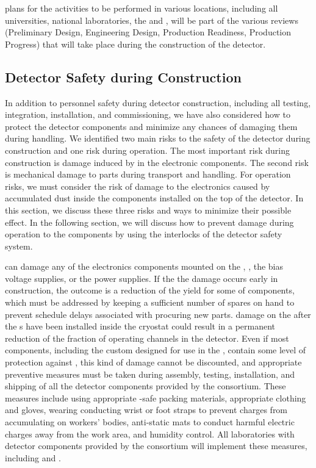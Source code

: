  plans for the activities to be performed in various
locations, including all universities, national laboratories,
the  and , will be part of the 
various reviews (Preliminary Design, Engineering Design, Production 
Readiness, Production Progress) that will take place during the construction of the detector.

\subsection{Detector Safety during Construction}
\label{sec:fdsp-tpcelec-safety-detcon}


In addition to personnel safety during detector
construction, including all testing, 
integration, installation, and commissioning, we have also
considered how to protect the detector
components and minimize any chances of damaging
them during handling. We identified two main risks 
to the safety of the detector during construction and one risk during
operation. The most important risk during construction is damage 
induced by  in the 
electronic components. The second risk is mechanical damage to 
parts during transport and handling. For operation risks, we
must consider the risk of damage to the electronics 
caused by accumulated dust inside the components
installed on the top of the detector. In this section, 
we discuss these three risks and ways to minimize their possible 
effect. In the following section, we will discuss how to prevent
damage during operation to the  components 
by using the interlocks of the detector safety system.

 can damage any of the electronics
components mounted on the , ,
the bias voltage supplies, or the power supplies. If the
the damage occurs early in construction, 
the outcome is a reduction
of the yield for some of components, which must be
addressed by keeping a sufficient number of spares on hand to prevent
schedule delays associated with procuring new parts. 
damage on the  after the s have been
installed inside the cryostat could result in a permanent
reduction of the fraction of operating channels in the
detector. Even if most components, including the custom 
 designed for use in the , contain 
some level of protection  against , this kind of damage cannot be discounted, and appropriate 
preventive measures must be taken during  
assembly, testing, installation, and shipping of all the detector 
components provided by the  consortium. These 
measures include using appropriate -safe packing materials, 
appropriate clothing and gloves, wearing conducting wrist or foot straps 
to prevent charges from accumulating 
on workers' bodies, anti-static mats to conduct harmful electric 
charges away from the work area, and humidity control. All laboratories with detector components provided by the  consortium will implement these
measures,
including  and . 

